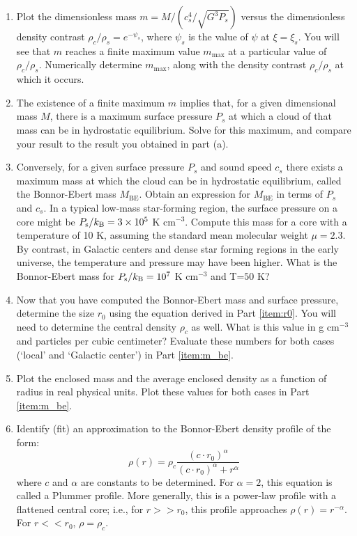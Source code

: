 \documentclass{article}
\begin{document}
\begin{enumerate}
\item Plot the dimensionless mass $m = M/(c_s^4/\sqrt{G^3 P_s})$ versus the dimensionless density contrast $\rho_c/\rho_s=e^{-\psi_s}$, where $\psi_s$ is the value of $\psi$ at $\xi=\xi_s$. You will see that $m$ reaches a finite maximum value $m_{\mathrm{max}}$ at a particular value of $\rho_c/\rho_s$. Numerically determine $m_{\mathrm{max}}$, along with the density contrast $\rho_c/\rho_s$ at which it occurs.
\item The existence of a finite maximum $m$ implies that, for a given dimensional mass $M$, there is a maximum surface pressure $P_s$ at which a cloud of that mass can be in hydrostatic equilibrium. Solve for this maximum, and compare your result to the result you obtained in part (a).
\item Conversely, for a given surface pressure $P_s$ and sound speed $c_s$ there exists a maximum mass at which the cloud can be in hydrostatic equilibrium, called the Bonnor-Ebert mass $M_{\mathrm{BE}}$. Obtain an expression for $M_{\mathrm{BE}}$ in terms of $P_s$ and $c_s$. In a typical low-mass star-forming region, the surface pressure on a core might be $P_{\mathrm{s}}/k_{\rm B} = 3\times 10^5$ K cm$^{-3}$. Compute this mass for a core with a temperature of 10 K, assuming the standard mean molecular weight $\mu=2.3$.\\
    By contrast, in Galactic centers and dense star forming regions in the early universe, the temperature and pressure may have been higher.  What is the Bonnor-Ebert mass for $P_{\mathrm{s}}/k_{\rm B} = 10^7$ K cm$^{-3}$ and T=$50$ K?
    \label{item:m_be}


\item Now that you have computed the Bonnor-Ebert mass and surface pressure, determine the size $r_0$ using the equation derived in Part \ref{item:r0}.
    You will need to determine the central density $\rho_c$ as well.  What is this value in g cm$^{-3}$ and particles per cubic centimeter?
    Evaluate these numbers for both cases (`local' and `Galactic center') in Part \ref{item:m_be}.

\item Plot the enclosed mass and the average enclosed density as a function of radius in real physical units.
    Plot these values for both cases in Part \ref{item:m_be}.

\item Identify (fit) an approximation to the Bonnor-Ebert density profile of the form:
    \begin{displaymath}
        \rho(r) = \rho_c \frac{(c \cdot r_0)^\alpha}{(c \cdot r_0)^\alpha + r^\alpha}
    \end{displaymath}
    where $c$ and $\alpha$ are constants to be determined.  
    For $\alpha=2$, this equation is called a Plummer profile.  More generally, this
    is a power-law profile with a flattened central core; i.e., for $r>>r_0$, this
    profile approaches $\rho(r) = r^{-\alpha}$.  For $r<<r_0$, $\rho=\rho_c$.


\end{enumerate}
\end{document}
